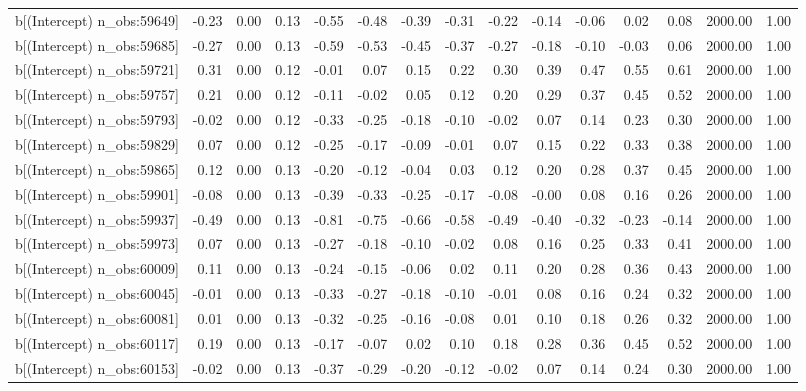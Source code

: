 \begin{table}[ht]
\begin{tabular}{rrrrrrrrrrrrrrr}
  b[(Intercept) n\_obs:59649] & -0.23 & 0.00 & 0.13 & -0.55 & -0.48 & -0.39 & -0.31 & -0.22 & -0.14 & -0.06 & 0.02 & 0.08 & 2000.00 & 1.00 \\ 
  b[(Intercept) n\_obs:59685] & -0.27 & 0.00 & 0.13 & -0.59 & -0.53 & -0.45 & -0.37 & -0.27 & -0.18 & -0.10 & -0.03 & 0.06 & 2000.00 & 1.00 \\ 
  b[(Intercept) n\_obs:59721] & 0.31 & 0.00 & 0.12 & -0.01 & 0.07 & 0.15 & 0.22 & 0.30 & 0.39 & 0.47 & 0.55 & 0.61 & 2000.00 & 1.00 \\ 
  b[(Intercept) n\_obs:59757] & 0.21 & 0.00 & 0.12 & -0.11 & -0.02 & 0.05 & 0.12 & 0.20 & 0.29 & 0.37 & 0.45 & 0.52 & 2000.00 & 1.00 \\ 
  b[(Intercept) n\_obs:59793] & -0.02 & 0.00 & 0.12 & -0.33 & -0.25 & -0.18 & -0.10 & -0.02 & 0.07 & 0.14 & 0.23 & 0.30 & 2000.00 & 1.00 \\ 
  b[(Intercept) n\_obs:59829] & 0.07 & 0.00 & 0.12 & -0.25 & -0.17 & -0.09 & -0.01 & 0.07 & 0.15 & 0.22 & 0.33 & 0.38 & 2000.00 & 1.00 \\ 
  b[(Intercept) n\_obs:59865] & 0.12 & 0.00 & 0.13 & -0.20 & -0.12 & -0.04 & 0.03 & 0.12 & 0.20 & 0.28 & 0.37 & 0.45 & 2000.00 & 1.00 \\ 
  b[(Intercept) n\_obs:59901] & -0.08 & 0.00 & 0.13 & -0.39 & -0.33 & -0.25 & -0.17 & -0.08 & -0.00 & 0.08 & 0.16 & 0.26 & 2000.00 & 1.00 \\ 
  b[(Intercept) n\_obs:59937] & -0.49 & 0.00 & 0.13 & -0.81 & -0.75 & -0.66 & -0.58 & -0.49 & -0.40 & -0.32 & -0.23 & -0.14 & 2000.00 & 1.00 \\ 
  b[(Intercept) n\_obs:59973] & 0.07 & 0.00 & 0.13 & -0.27 & -0.18 & -0.10 & -0.02 & 0.08 & 0.16 & 0.25 & 0.33 & 0.41 & 2000.00 & 1.00 \\ 
  b[(Intercept) n\_obs:60009] & 0.11 & 0.00 & 0.13 & -0.24 & -0.15 & -0.06 & 0.02 & 0.11 & 0.20 & 0.28 & 0.36 & 0.43 & 2000.00 & 1.00 \\ 
  b[(Intercept) n\_obs:60045] & -0.01 & 0.00 & 0.13 & -0.33 & -0.27 & -0.18 & -0.10 & -0.01 & 0.08 & 0.16 & 0.24 & 0.32 & 2000.00 & 1.00 \\ 
  b[(Intercept) n\_obs:60081] & 0.01 & 0.00 & 0.13 & -0.32 & -0.25 & -0.16 & -0.08 & 0.01 & 0.10 & 0.18 & 0.26 & 0.32 & 2000.00 & 1.00 \\ 
  b[(Intercept) n\_obs:60117] & 0.19 & 0.00 & 0.13 & -0.17 & -0.07 & 0.02 & 0.10 & 0.18 & 0.28 & 0.36 & 0.45 & 0.52 & 2000.00 & 1.00 \\ 
  b[(Intercept) n\_obs:60153] & -0.02 & 0.00 & 0.13 & -0.37 & -0.29 & -0.20 & -0.12 & -0.02 & 0.07 & 0.14 & 0.24 & 0.30 & 2000.00 & 1.00 \\ 

\end{tabular}
\end{table}
